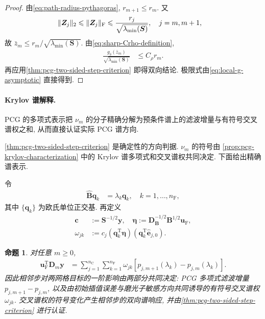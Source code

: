 \documentclass{ctexart}
\newcommand{\q}{\quad}
\newcommand{\T}{\mathrm{T}}
\newcommand{\dt}{\delta}
\renewcommand{\ge}{\geqslant}
\renewcommand{\le}{\leqslant}
\DeclarePairedDelimiter\norm{\lVert}{\rVert}
\newtheorem{proposition}[theorem]{命题}
\begin{document}
\begin{proof}
由\cref{eq:path-radius-pythagoras}, $r_{m+1}\le r_m$. 又
\begin{align}
    \norm{\bm Z_j}_2
    &\le\norm{\bm Z_j}_{\mathrm F}
     \le\frac{r_j}{\sqrt{\lambda_{\min}(\bm S)}},\q j=m,m+1,
    \label{eq:step-z-by-r}
\end{align}
故 $\bar z_m\le r_m/\sqrt{\lambda_{\min}(\bm S)}$. 由\cref{eq:sharp-Crho-definition},
\begin{align}
    \frac{g_\dt(\bar z_m)}{\sqrt{\lambda_{\min}(\bm S)}}
    &\le C_\rho r_m.
    \label{eq:sharp-threshold-by-Crho}
\end{align}
再应用\cref{thm:pcg-two-sided-step-criterion} 即得双向结论. 极限式由\cref{eq:local-g-asymptotic} 直接得到.
\end{proof}


\paragraph{Krylov 谱解释.}
PCG 的多项式表示把 $\nu_m$ 的分子精确分解为预条件谱上的滤波增量与有符号交叉谱权之和, 从而直接认证实际 PCG 谱方向.

\cref{thm:pcg-two-sided-step-criterion} 是确定性的方向判据. $\nu_m$ 的符号由
\cref{prop:pcg-krylov-characterization} 中的 Krylov 谱多项式和交叉谱权共同决定. 下面给出精确谱表示.

令
\begin{align}
    \widehat{\bm B}\bm q_k&=\lambda_k\bm q_k,\q
    k=1,\ldots,n_{\mathrm F},
    \label{eq:pcg-preconditioned-eigenpairs}
\end{align}
其中 $\{\bm q_k\}$ 为欧氏单位正交基. 再定义
\begin{align}
    \bm c&:=\bm S^{-1/2}\bm y,\q
    \bm\eta:=\bm D_{\bm B}^{-1/2}\bm B^{1/2}\bm u_{\mathrm F},
    \label{eq:pcg-cross-spectral-vectors}\\
    \omega_{jk}
    &:=
    c_j
    (\bm q_k^\T\bm\eta)
    (\bm q_k^\T\widehat{\bm e}_{j,0}).
    \label{eq:pcg-cross-spectral-weights}
\end{align}

\begin{proposition}
\label{prop:pcg-alignment-spectral}
对任意 $m\ge0$,
\begin{align}
    \bm u_{\mathrm F}^\T\bm D_m\bm y
    &=
    \sum_{j=1}^{n_{\mathrm C}}
    \sum_{k=1}^{n_{\mathrm F}}
    \omega_{jk}
    \left[
      p_{j,m+1}(\lambda_k)-p_{j,m}(\lambda_k)
    \right].
    \label{eq:pcg-alignment-spectral}
\end{align}
因此相邻步对两网格目标的一阶影响由两部分共同决定:
PCG 多项式滤波增量
$p_{j,m+1}-p_{j,m}$, 以及由初始插值误差与磨光子敏感方向共同诱导的有符号交叉谱权
$\omega_{jk}$. 交叉谱权的符号变化产生相邻步的双向谱响应,
并由\cref{thm:pcg-two-sided-step-criterion} 进行认证.
\end{proposition}
\end{document}
